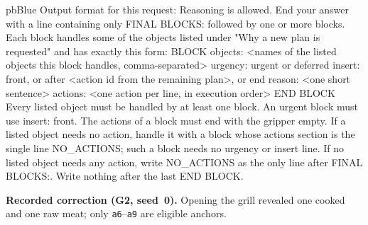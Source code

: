 \begin{promptbox}[unbreakable]{pbBlue}{}
Output format for this request:
Reasoning is allowed. End your answer with a line containing only FINAL BLOCKS: followed by one or more blocks. Each block handles some of the objects listed under "Why a new plan is requested" and has exactly this form:
BLOCK
objects: <names of the listed objects this block handles, comma-separated>
urgency: urgent or deferred
insert: front, or after <action id from the remaining plan>, or end
reason: <one short sentence>
actions:
<one action per line, in execution order>
END BLOCK
Every listed object must be handled by at least one block. An urgent block must use insert: front. The actions of a block must end with the gripper empty. If a listed object needs no action, handle it with a block whose actions section is the single line NO_ACTIONS; such a block needs no urgency or insert line. If no listed object needs any action, write NO_ACTIONS as the only line after FINAL BLOCKS:. Write nothing after the last END BLOCK.
\end{promptbox}

\noindent\textbf{Recorded correction (G2, seed~0).} Opening the grill revealed one cooked and one raw meat; only
\texttt{a6}--\texttt{a9} are eligible anchors.

